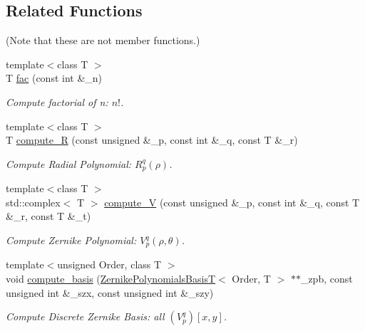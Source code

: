 \subsection*{Related Functions}
(Note that these are not member functions.) \begin{DoxyCompactItemize}
\item 
{\footnotesize template$<$class T $>$ }\\T \hyperlink{classzsig_1_1ZernikePolynomialsBasisT_a72671dd3a9e2d20f434c5c2c87405ef1}{fac} (const int \&\_\-n)
\begin{DoxyCompactList}\small\item\em Compute factorial of n: $n!$. \item\end{DoxyCompactList}\item 
{\footnotesize template$<$class T $>$ }\\T \hyperlink{classzsig_1_1ZernikePolynomialsBasisT_aed020103343d1c0210cc929069b07559}{compute\_\-R} (const unsigned \&\_\-p, const int \&\_\-q, const T \&\_\-r)
\begin{DoxyCompactList}\small\item\em Compute Radial Polynomial: $R_{p}^{q}(\rho)$. \item\end{DoxyCompactList}\item 
{\footnotesize template$<$class T $>$ }\\std::complex$<$ T $>$ \hyperlink{classzsig_1_1ZernikePolynomialsBasisT_a407b805297a8157b3e4d47281f1bcaff}{compute\_\-V} (const unsigned \&\_\-p, const int \&\_\-q, const T \&\_\-r, const T \&\_\-t)
\begin{DoxyCompactList}\small\item\em Compute Zernike Polynomial: $V_{p}^{q}(\rho, \theta)$. \item\end{DoxyCompactList}\item 
{\footnotesize template$<$unsigned Order, class T $>$ }\\void \hyperlink{classzsig_1_1ZernikePolynomialsBasisT_a2acab5e0bda03423004dc2a7f579ae69}{compute\_\-basis} (\hyperlink{classzsig_1_1ZernikePolynomialsBasisT}{ZernikePolynomialsBasisT}$<$ Order, T $>$ $\ast$$\ast$\_\-zpb, const unsigned int \&\_\-szx, const unsigned int \&\_\-szy)
\begin{DoxyCompactList}\small\item\em Compute Discrete Zernike Basis: all $(V_{p}^{q})[x,y]$. \item\end{DoxyCompactList}\end{DoxyCompactItemize}


